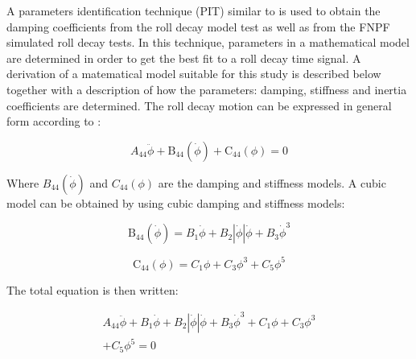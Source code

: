     A parameters identification technique (PIT) similar to
\cite{7505983/EXYJELCU} is used to obtain the damping coefficients from
the roll decay model test as well as from the FNPF simulated roll decay
tests. In this technique, parameters in a mathematical model are
determined in order to get the best fit to a roll decay time signal. A
derivation of a matematical model suitable for this study is described
below together with a description of how the parameters: damping,
stiffness and inertia coefficients are determined. The roll decay motion
can be expressed in general form according to \cite{7505983/FB64RGPF}:
 
            
    
    \begin{equation}
A_{44} \ddot{\phi} + \operatorname{B_{44}}\left(\dot{\phi}\right) + \operatorname{C_{44}}\left(\phi\right) = 0
\label{eq:equation}
\end{equation}

    

    Where $B_{44}(\dot{\phi})$ and $C_{44}(\phi)$ are the damping and
stiffness models. A cubic model can be obtained by using cubic damping
and stiffness models:
 
            
    
    \begin{equation}
\operatorname{B_{44}}\left(\dot{\phi}\right) = B_{1} \dot{\phi} + B_{2} \left|{\dot{\phi}}\right| \dot{\phi} + B_{3} \dot{\phi}^{3}
\label{eq:equation}
\end{equation}

    
 
            
    
    \begin{equation}
\operatorname{C_{44}}\left(\phi\right) = C_{1} \phi + C_{3} \phi^{3} + C_{5} \phi^{5}
\label{eq:equation}
\end{equation}

    

    The total equation is then written:
 
            
    
    \begin{equation}
\begin{aligned}
A_{44} \ddot{\phi} + B_{1} \dot{\phi} + B_{2} \left|{\dot{\phi}}\right| \dot{\phi} + B_{3} \dot{\phi}^{3} + C_{1} \phi + C_{3} \phi^{3} \\ + C_{5} \phi^{5} = 0
\end{aligned}
\label{eq:equation}
\end{equation}

